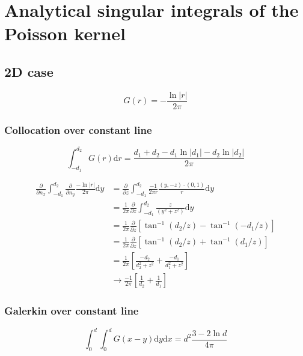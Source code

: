 \documentclass[a4paper,11pt]{article}
\newcommand{\td}{\mathrm{d}}
\begin{document}
\section{Analytical singular integrals of the Poisson kernel}

\subsection{2D case}

\begin{equation}
G(r) = -\frac{\ln |r|}{2\pi}
\end{equation}

\subsubsection{Collocation over constant line}

\begin{equation}
\int_{-d_1}^{d_2} G(r) \td r
=
\frac{d_1 + d_2 - d_1 \ln |d_1| - d_2 \ln |d_2|}{2\pi}
\end{equation}

\begin{align}
\frac{\partial}{\partial n_x}
\int_{-d_1}^{d_2} 
\frac{\partial}{\partial n_y}
\frac{-\ln |r|}{2\pi}
\td y 
&=
\frac{\partial}{\partial z}
\int_{-d_1}^{d_2} 
\frac{-1}{2\pi r} \frac{(y, -z) \cdot (0,1)}{r}
\td y \nonumber \\
&=
\frac{1}{2\pi} \frac{\partial}{\partial z}
\int_{-d_1}^{d_2} 
\frac{z}{\left(y^2+z^2\right)}
\td y \nonumber \\
&=
\frac{1}{2\pi} \frac{\partial}{\partial z}
\left[
\tan^{-1}\left(d_2/z\right)
-
\tan^{-1}\left(-d_1/z\right)
\right]
\nonumber \\
&=
\frac{1}{2\pi} \frac{\partial}{\partial z}
\left[
\tan^{-1}\left(d_2/z\right) + \tan^{-1}\left(d_1/z\right)
\right]
\nonumber \\
&=
\frac{1}{2\pi} 
\left[
\frac{-d_2}{d_2^2+z^2} + \frac{-d_1}{d_1^2+z^2}
\right]
\nonumber \\
& \to
\frac{-1}{2\pi} 
\left[
\frac{1}{d_2} + \frac{1}{d_1}
\right]
\end{align}


\subsubsection{Galerkin over constant line}

\begin{equation}
\int_{0}^{d} \int_{0}^{d} G(x-y) \td y \td x
=
d^2\frac{3-2\ln d}{4\pi}
\end{equation}
\end{document}
